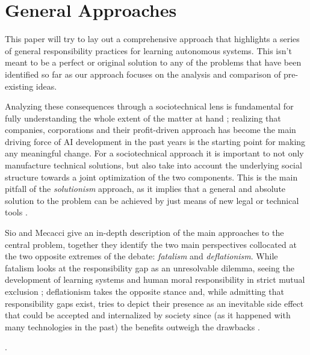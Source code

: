 \section{General Approaches}\label{sec:approaches}

This paper will try to lay out a comprehensive approach that highlights a series of general responsibility practices for learning autonomous systems.
This isn't meant to be a perfect or original solution to any of the problems that have been identified so far as our approach focuses on the analysis and comparison of pre-existing ideas.

Analyzing these consequences through a sociotechnical lens is fundamental for fully un\-der\-stand\-ing the whole extent of the matter at hand \parencite{THETE, NOVAIA}; realizing that companies, corporations and their profit-driven approach has become the main driving force of AI development in the past years is the starting point for making any meaningful change.
For a sociotechnical approach it is important to not only manufacture technical solutions, but also take into account the underlying social structure towards a joint optimization of the two components.
This is the main pitfall of the \textit{solutionism} approach, as it implies that a general and absolute solution to the problem can be achieved by just means of new legal or technical tools \parencite{MORTSE, STILML, SANFRG}.

Sio and Mecacci give an in-depth description of the main approaches to the central problem, together they identify the two main perspectives collocated at the two opposite extremes of the debate: \textit{fatalism} and \textit{deflationism}.
While fatalism looks at the responsibility gap as an unresolvable dilemma, seeing the development of learning systems and human moral responsibility in strict mutual exclusion \parencite{MATTRG}; deflationism takes the opposite stance and, while admitting that responsibility gaps exist, tries to depict their presence as an inevitable side effect that could be accepted and internalized by society since (as it happened with many technologies in the past) the benefits outweigh the drawbacks \parencite{HAYTMP, SIJWA}.

.